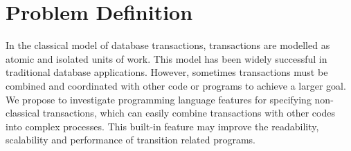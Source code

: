 \documentclass{sig-alternate-05-2015}
\begin{document}
\section{Problem Definition}
\label{sec:modern}

In the classical model of database transactions, transactions are modelled as atomic and isolated units of work. This model has been widely successful in traditional database applications. However, sometimes transactions must be combined and coordinated with other code or programs to achieve a larger goal. We propose to investigate programming language features for specifying non-classical transactions, which can easily combine transactions with other codes into complex processes. This built-in feature may improve the readability, scalability and performance of transition related programs.



\end{document}
